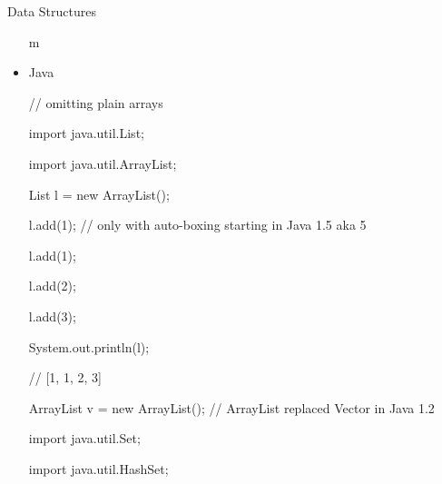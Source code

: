 \documentclass{beamer}
\begin{document}
\begin{frame}[allowframebreaks]{Data Structures}
\begin{itemize}
\begin{small}
{\ttfamily\color{black}
m}
\end{small}
  \item Java\\
\begin{small}
{\ttfamily\color{black}
%
\textcolor[rgb]{0.69803923,0.13333334,0.13333334}{// omitting plain
arrays}}

{\ttfamily\color{black}
\textcolor[rgb]{0.49803922,0.0,0.49803922}{import}
\textcolor[rgb]{0.0,0.54509807,0.54509807}{java}.\textcolor[rgb]{0.0,0.54509807,0.54509807}{util}.\textcolor[rgb]{0.13333334,0.54509807,0.13333334}{List};}

{\ttfamily\color{black}
\textcolor[rgb]{0.49803922,0.0,0.49803922}{import}
\textcolor[rgb]{0.0,0.54509807,0.54509807}{java}.\textcolor[rgb]{0.0,0.54509807,0.54509807}{util}.\textcolor[rgb]{0.13333334,0.54509807,0.13333334}{ArrayList};}

{\ttfamily\color{black}
\textcolor[rgb]{0.13333334,0.54509807,0.13333334}{List}
\textcolor[rgb]{0.627451,0.32156864,0.1764706}{l} =
\textcolor[rgb]{0.49803922,0.0,0.49803922}{new}
\textcolor[rgb]{0.13333334,0.54509807,0.13333334}{ArrayList}();}

{\ttfamily\color{black}
l.add(1); \textcolor[rgb]{0.69803923,0.13333334,0.13333334}{// only with
auto-boxing starting in Java 1.5 aka 5}}

{\ttfamily\color{black}
l.add(1);}

{\ttfamily\color{black}
l.add(2);}

{\ttfamily\color{black}
l.add(3);}

{\ttfamily\color{black}
System.out.println(l);}

{\ttfamily\color{black}
\textcolor[rgb]{0.69803923,0.13333334,0.13333334}{// [1, 1, 2, 3]}}

{\ttfamily\color{black}
\textcolor[rgb]{0.13333334,0.54509807,0.13333334}{ArrayList}
\textcolor[rgb]{0.627451,0.32156864,0.1764706}{v} =
\textcolor[rgb]{0.49803922,0.0,0.49803922}{new}
\textcolor[rgb]{0.13333334,0.54509807,0.13333334}{ArrayList}();
\textcolor[rgb]{0.69803923,0.13333334,0.13333334}{// ArrayList replaced
Vector in Java 1.2}}


\bigskip

{\ttfamily\color{black}
%
\textcolor[rgb]{0.49803922,0.0,0.49803922}{import}
\textcolor[rgb]{0.0,0.54509807,0.54509807}{java}.\textcolor[rgb]{0.0,0.54509807,0.54509807}{util}.\textcolor[rgb]{0.13333334,0.54509807,0.13333334}{Set};}

{\ttfamily\color{black}
\textcolor[rgb]{0.49803922,0.0,0.49803922}{import}
\textcolor[rgb]{0.0,0.54509807,0.54509807}{java}.\textcolor[rgb]{0.0,0.54509807,0.54509807}{util}.\textcolor[rgb]{0.13333334,0.54509807,0.13333334}{HashSet};}


\end{small}
\end{itemize}
\end{frame}
\end{document}
